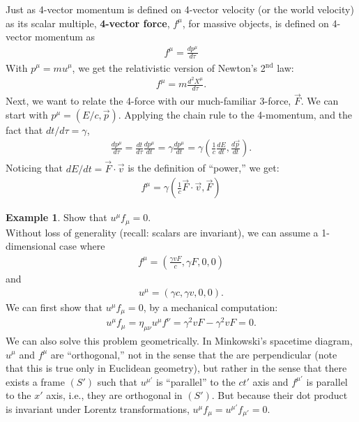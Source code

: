 \documentclass{book}
\theoremstyle{definition}
\newtheorem{exmp}{Example}[section]
\begin{document}
Just as 4-vector momentum is defined on 4-vector velocity (or the world velocity) as its scalar multiple, \textbf{4-vector force}, $f^\mu$, for massive objects, is defined on 4-vector momentum as
\begin{align*}
\boxed{f^\mu = \frac{dp^\mu}{d\tau}}
\end{align*}
With $p^\mu = mu^\mu$, we get the relativistic version of Newton's 2$^\text{nd}$ law:
\begin{align*}
f^\mu = m\frac{d^2X^\mu}{d\tau}.
\end{align*}
Next, we want to relate the 4-force with our much-familiar 3-force, $\vec{F}$. We can start with $p^\mu = (E/c, \vec{p})$. Applying the chain rule to the 4-momentum, and the fact that $dt/d\tau = \gamma$,
\begin{align*}
\frac{dp^\mu}{d\tau} = \frac{dt}{d\tau}\frac{dp^\mu}{dt} = \gamma\frac{dp^\mu}{dt} = \gamma\left( \frac{1}{c}\frac{dE}{dt},\frac{d\vec{p}}{dt} \right).
\end{align*}
Noticing that $dE/dt = \vec{F}\cdot\vec{v}$ is the definition of ``power,'' we get:
\begin{align*}
\boxed{f^\mu = \gamma\left( \frac{1}{c}\vec{F}\cdot\vec{v}, \vec{F} \right)} 
\end{align*}
\begin{exmp}
	Show that $u^\mu f_\mu = 0$.\\
	
	Without loss of generality (recall: scalars are invariant), we can assume a 1-dimensional case where
	\begin{align*}
	f^\mu = \left( \frac{\gamma v F}{c}, \gamma F, 0,0\right) 
	\end{align*}
	and
	\begin{align*}
	u^\mu = \left( \gamma c, \gamma v,0,0 \right). 
	\end{align*}
	We can first show that $u^\mu f_\mu = 0$, by a mechanical computation:
	\begin{align*}
	u^\mu f_\mu = \eta_{\mu\nu}u^\mu f^\nu = \gamma^2vF - \gamma^2 vF = 0.
	\end{align*}
	We can also solve this problem geometrically. In Minkowski's spacetime diagram, $u^\mu$ and $f^\mu$ are ``orthogonal,'' not in the sense that the are perpendicular (note that this is true only in Euclidean geometry), but rather in the sense that there exists a frame $(S')$ such that $u^{\mu'}$ is ``parallel'' to the $ct'$ axis and $f^{\mu'}$ is parallel to the $x'$ axis, i.e., they are orthogonal in $(S')$. But because their dot product is invariant under Lorentz transformations, $u^\mu f_\mu = u^{\mu'}f_{\mu'} = 0$. 

\end{exmp}
\end{document}
